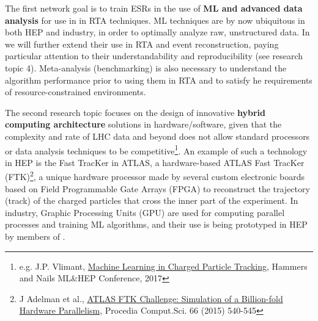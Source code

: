 The first network goal is to train ESRs in the use of \textbf{ML and advanced data analysis} for use in in RTA techniques.
ML techniques are by now ubiquitous in both HEP and industry, in order to optimally analyze raw, unstructured data. 
In \acronym we will further extend their use in RTA and event reconstruction, paying particular attention to their understandability and reproducibility (see research topic 4).
Meta-analysis (benchmarking) is also necessary to understand the algorithm performance prior to using them in RTA and to satisfy he requirements of resource-constrained environments.

\begin{center}
\vskip-15pt
\end{center}
\vskip-5pt
The second research topic focuses on the design of innovative \textbf{hybrid computing architecture} solutions in hardware/software, given that the complexity and rate of LHC data and beyond does not allow standard processors or data analysis techniques to be competitive\footnote{e.g. J.P. Vlimant, \href{https://erez.weizmann.ac.il/pls/htmldb/f?p=101:58:::NO:RP:P58_CODE,P58_FILE:5393,Y}{Machine Learning in Charged Particle Tracking}, Hammers and Nails ML\&HEP Conference, 2017}. An example of such a technology in HEP is the Fast TracKer in ATLAS, a hardware-based ATLAS Fast TracKer (FTK)\footnote{J Adelman et al., \href{https://inspirehep.net/record/1614024/}{ATLAS FTK Challenge: Simulation of a Billion-fold Hardware Parallelism,} Procedia Comput.Sci. 66 (2015) 540-545}, a unique hardware processor made by several custom electronic boards based on Field Programmable Gate Arrays (FPGA) to reconstruct the trajectory (track) of the charged particles that cross the inner part of the experiment. In industry, Graphic Processing Units (GPU) are used for computing parallel processes and training ML algorithms, and their use is being prototyped in HEP by members of \acronym. 
